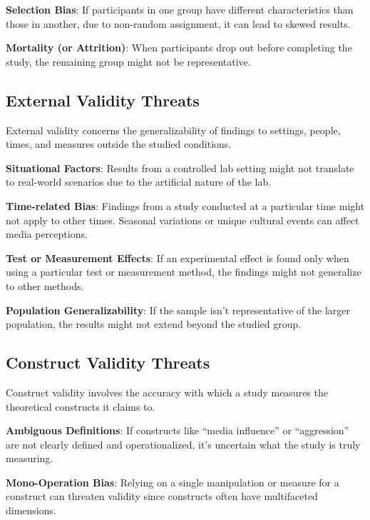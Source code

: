 \documentclass[
  b5paper]{book}
\begin{document}
\textbf{Selection Bias}: If participants in one group have different characteristics than those in another, due to non-random assignment, it can lead to skewed results.

\textbf{Mortality (or Attrition)}: When participants drop out before completing the study, the remaining group might not be representative.

\hypertarget{external-validity-threats}{%
\subsection*{External Validity Threats}\label{external-validity-threats}}

External validity concerns the generalizability of findings to settings, people, times, and measures outside the studied conditions.

\textbf{Situational Factors}: Results from a controlled lab setting might not translate to real-world scenarios due to the artificial nature of the lab.

\textbf{Time-related Bias}: Findings from a study conducted at a particular time might not apply to other times. Seasonal variations or unique cultural events can affect media perceptions.

\textbf{Test or Measurement Effects}: If an experimental effect is found only when using a particular test or measurement method, the findings might not generalize to other methods.

\textbf{Population Generalizability}: If the sample isn't representative of the larger population, the results might not extend beyond the studied group.

\hypertarget{construct-validity-threats}{%
\subsection*{Construct Validity Threats}\label{construct-validity-threats}}

Construct validity involves the accuracy with which a study measures the theoretical constructs it claims to.

\textbf{Ambiguous Definitions}: If constructs like ``media influence'' or ``aggression'' are not clearly defined and operationalized, it's uncertain what the study is truly measuring.

\textbf{Mono-Operation Bias}: Relying on a single manipulation or measure for a construct can threaten validity since constructs often have multifaceted dimensions.
\end{document}
